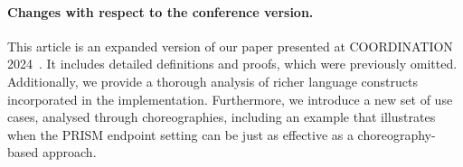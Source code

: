 \paragraph{Changes with respect to the conference version.}
%
This article is an expanded version of our paper presented at
COORDINATION 2024~\cite{CV24}. It includes detailed definitions and
proofs, which were previously omitted. Additionally, we provide a
thorough analysis of richer language constructs incorporated in the
implementation. Furthermore, we introduce a new set of use cases,
analysed through choreographies, including an example that illustrates
when the PRISM endpoint setting can be just as effective as a
choreography-based approach.


